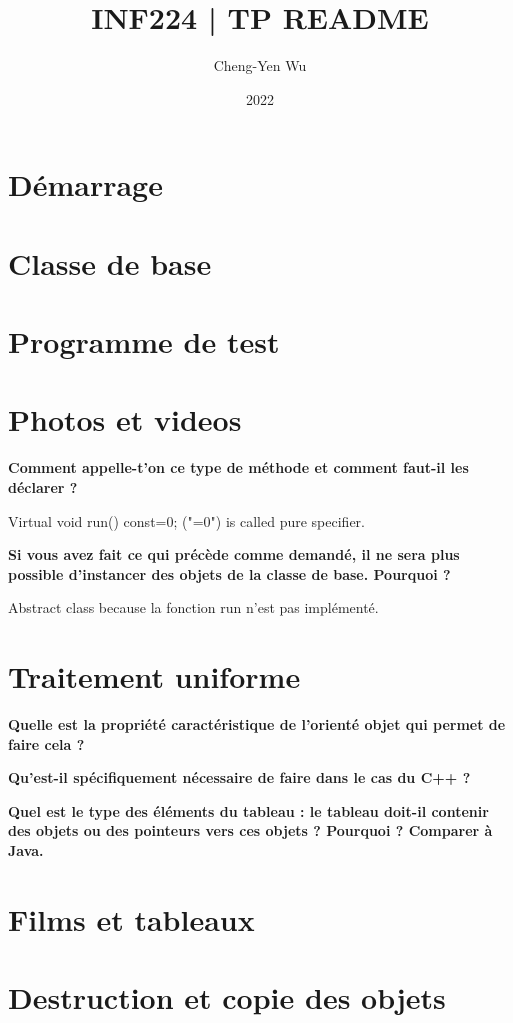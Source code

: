 \documentclass[a4paper]{article}
\title{\vspace{-2cm}INF224 | TP README}
\author{Cheng-Yen Wu}
\date{2022}
\begin{document}
\maketitle

\section{Démarrage}
\section{Classe de base}
\section{Programme de test}
\section{Photos et videos}

\textbf{Comment appelle-t'on ce type de méthode et comment faut-il les déclarer
?}

Virtual void run() const=0; 
("=0") is called pure specifier. 

\textbf{ Si vous avez fait ce qui précède comme demandé, il ne sera plus
possible d'instancer des objets de la classe de base. Pourquoi ? }

Abstract class because la fonction run n'est pas implémenté. 





\section{Traitement uniforme}

\textbf{Quelle est la propriété caractéristique de l'orienté objet qui permet de
faire cela ?}

\textbf{Qu'est-il spécifiquement nécessaire de faire dans le cas du C++ ?} 

\textbf{Quel est le type des éléments du tableau : le tableau doit-il contenir
des objets ou des pointeurs vers ces objets ? Pourquoi ?  Comparer à Java.} 

\section{Films et tableaux}
\section{Destruction et copie des objets}
\end{document}
